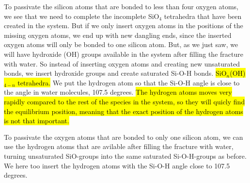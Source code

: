 To passivate the silicon atoms that are bonded to less than four oxygen atoms, we see that we need to complete the incomplete SiO$_4$ tetrahedra that have been created in the system. But if we only insert oxygen atoms in the positions of the missing oxygen atoms, we end up with new dangling ends, since the inserted oxygen atoms will only be bonded to one silicon atom. But, as we just saw, we will have hydroxide (OH) groups available in the system after filling the fracture with water. So instead of inserting oxygen atoms and creating new unsaturated bonds, we insert hydroxide groups and create saturated Si-O-H bonds. \hl{ SiO$_n$(OH)$_{4-n}$ tetrahedra.} We put the hydrogen atom so that the Si-O-H angle is close to the angle in water molecules, 107.5 degrees. \hl{The hydrogen atoms moves very rapidly compared to the rest of the species in the system, so they will quicly find the equilibrium position, meaning that the exact position of the hydrogen atoms is not that important.}

To passivate the oxygen atoms that are bonded to only one silicon atom, we can use the hydrogen atoms that are avilable after filling the fracture with water, turning unsaturated SiO-groups into the same saturated Si-O-H-groups as before. We here too insert the hydrogen atoms with the Si-O-H angle close to 107.5 degrees.

